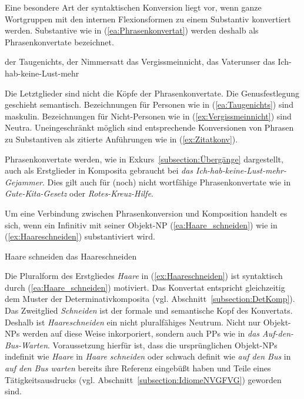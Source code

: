 Eine besondere Art der syntaktischen Konversion liegt vor, wenn ganze Wortgruppen mit den internen Flexionsformen zu einem Substantiv konvertiert werden. Substantive wie in (\ref{ea:Phrasenkonvertat}) werden deshalb als Phrasenkonvertate bezeichnet.  

\ea \label{ea:Phrasenkonvertat}
\ea \label{ea:Taugenichts} der Taugenichts, der Nimmersatt
\ex \label{ex:Vergissmeinnicht} das Vergissmeinnicht, das Vaterunser
\ex \label{ex:Zitatkonv} das Ich-hab-keine-Lust-mehr
\z 
\z 

Die Letztglieder sind nicht die Köpfe der Phrasenkonvertate. Die Genusfestlegung geschieht semantisch. Bezeichnungen für Personen wie in (\ref{ea:Taugenichts}) sind maskulin. Bezeichnungen für Nicht-Personen wie in (\ref{ex:Vergissmeinnicht}) sind Neutra. Uneingeschränkt möglich sind entsprechende Konversionen von Phrasen zu Substantiven als zitierte Anführungen wie in (\ref{ex:Zitatkonv}).

Phrasenkonvertate werden, wie in Exkurs~\ref{subsection:Übergänge} dargestellt, auch als Erstglieder in Komposita gebraucht \zB bei \textit{das Ich-hab-keine-Lust-mehr-Gejammer}. Dies gilt auch für (noch) nicht wortfähige Phrasenkonvertate wie in \textit{Gute-Kita-Gesetz} oder \textit{Rotes-Kreuz-Hilfe}. 
 

Um eine Verbindung zwischen Phrasenkonversion und Komposition handelt es sich, wenn ein Infinitiv mit seiner Objekt-NP (\ref{ea:Haare_schneiden}) wie in (\ref{ex:Haareschneiden}) substantiviert wird.

\ea \label{ea:Phrasenkonv_Haareschneiden}
\ea \label{ea:Haare_schneiden} Haare schneiden
\ex \label{ex:Haareschneiden} das Haareschneiden
\z 
\z 

Die Pluralform des Erstgliedes \textit{Haare} in (\ref{ex:Haareschneiden}) ist syntaktisch durch (\ref{ea:Haare_schneiden}) motiviert. Das Konvertat entspricht gleichzeitig dem Muster der Determinativkomposita (vgl. Abschnitt~\ref{subsection:DetKomp}). Das Zweitglied \textit{Schneiden} ist der formale und semantische Kopf des Konvertats. Deshalb ist \textit{Haareschneiden} ein nicht pluralfähiges Neutrum. Nicht nur Objekt-NPs werden auf diese Weise inkorporiert, sondern auch PPs wie in \textit{das Auf-den-Bus-Warten}. Voraussetzung hierfür ist, dass die ursprünglichen Objekt-NPs indefinit wie \textit{Haare} in \textit{Haare schneiden} oder schwach definit wie \textit{auf den Bus} in \textit{auf den Bus warten} bereits ihre Referenz eingebüßt haben und Teile eines Tätigkeitsausdrucks (vgl. Abschnitt~\ref{subsection:IdiomeNVGFVG}) geworden sind.


